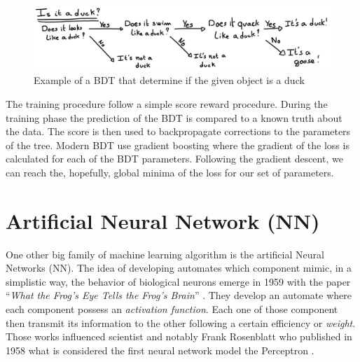 \begin{figure}
  \centering
  \includegraphics[width=\linewidth]{images/ml/Bdt.jpg}
  \caption{Example of a BDT that determine if the given object is a duck}
  \label{fig:ml:bdt}
\end{figure}

The training procedure follow a simple score reward procedure. During the training phase the prediction of the BDT is compared to a known truth about the data. The score is then used to backpropagate corrections to the parameters of the tree. Modern BDT use gradient boosting where the gradient of the loss is calculated for each of the BDT parameters. Following the gradient descent, we can reach the, hopefully, global minima of the loss for our set of parameters.

\section{Artificial Neural Network (NN)}

One other big family of machine learning algorithm is the artificial Neural Networks (NN). The idea of developing automates which component mimic, in a simplistic way, the behavior of biological neurons emerge in 1959 with the paper ``\textit{What the Frog's Eye Tells the Frog's Brain}'' \cite{lettvin_what_1959}. They develop an automate where each component possess an \textit{activation function}. Each one of those component then transmit its information to the other following a certain efficiency or \textit{weight}.
Those works influenced scientist and notably Frank Rosenblatt who published in 1958 what is considered the first neural network model the Perceptron \cite{rosenblatt_perceptron_1958}.


